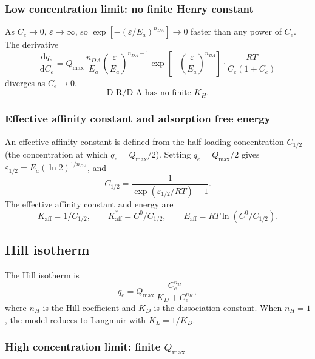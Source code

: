 \documentclass[journal=aamick,manuscript=article]{achemso}
\begin{document}
\subsubsection{Low concentration limit: no finite Henry constant}

As $C_e \to 0$, $\varepsilon \to \infty$, so
$\exp[-(\varepsilon/E_a)^{n_{DA}}] \to 0$ faster than any power of $C_e$. The derivative
\begin{equation}
	\frac{\mathrm{d}q_e}{\mathrm{d}C_e}
	= Q_{\max}\, \frac{n_{DA}}{E_a}
	\left(\frac{\varepsilon}{E_a}\right)^{n_{DA}-1}
	\exp\!\left[-\left(\frac{\varepsilon}{E_a}\right)^{n_{DA}}\right]
	\cdot \frac{RT}{C_e(1+C_e)}
\end{equation}
diverges as $C_e \to 0$.
\begin{equation}
	\boxed{\text{D-R/D-A has no finite } K_H.}
\end{equation}

\subsubsection{Effective affinity constant and adsorption free energy}

An effective affinity constant is defined from the half-loading concentration $C_{1/2}$
(the concentration at which $q_e = Q_{\max}/2$).
Setting $q_e = Q_{\max}/2$ gives $\varepsilon_{1/2} = E_a(\ln 2)^{1/n_{DA}}$, and
\begin{equation}
	C_{1/2} = \frac{1}{\exp(\varepsilon_{1/2}/RT) - 1}.
\end{equation}
The effective affinity constant and energy are
\begin{equation}
	\boxed{
		K_{\mathrm{aff}} = 1/C_{1/2},
		\qquad
		K_{\mathrm{aff}}^{\ast} = C^0/C_{1/2},
		\qquad
		E_{\mathrm{aff}} = RT\ln(C^0/C_{1/2}).
	}
\end{equation}

\subsection{Hill isotherm}
\label{sec:si_hill}

The Hill isotherm is
\begin{equation}
	q_e = Q_{\max}\,\frac{C_e^{n_H}}{K_D + C_e^{n_H}},
	\label{eq:si_hill}
\end{equation}
where $n_H$ is the Hill coefficient and $K_D$ is the dissociation constant.
When $n_H = 1$, the model reduces to Langmuir with $K_L = 1/K_D$.

\subsubsection{High concentration limit: finite $Q_{\max}$}
\end{document}
